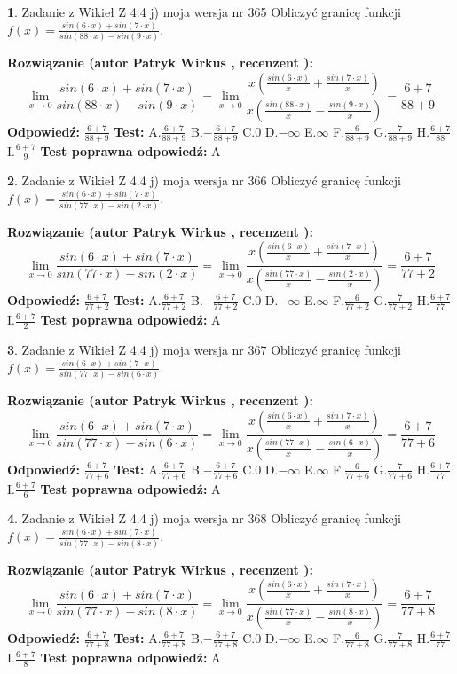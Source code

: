 \documentclass[12pt, a4paper]{article}
\theoremstyle{definition} %
\newtheorem{zad}{}
\newcommand{\zadStart}[1]{\begin{zad}#1\newline}
\newcommand{\zadStop}{\end{zad}}
\newcommand{\rozwStart}[2]{\noindent \textbf{Rozwiązanie (autor #1 , recenzent #2): }\newline}
\newcommand{\rozwStop}{\newline}
\newcommand{\odpStart}{\noindent \textbf{Odpowiedź:}\newline}
\newcommand{\odpStop}{\newline}
\newcommand{\testStart}{\noindent \textbf{Test:}\newline}
\newcommand{\testStop}{\newline}
\newcommand{\kluczStart}{\noindent \textbf{Test poprawna odpowiedź:}\newline}
\newcommand{\kluczStop}{\newline}
\begin{document}
\zadStart{Zadanie z Wikieł Z 4.4 j) moja wersja nr 365}
Obliczyć granicę funkcji $f(x)=\frac{sin(6\cdot x) +sin(7\cdot x)}{sin(88\cdot x) -sin(9\cdot x)}$.
\zadStop
\rozwStart{Patryk Wirkus}{}
$$\lim\limits_{x\to 0}\frac{sin(6\cdot x) +sin(7\cdot x)}{sin(88\cdot x) -sin(9\cdot x)}=\lim\limits_{x\to 0}\frac{x(\frac{sin(6\cdot x)}{x}+\frac{sin(7\cdot x)}{x})}{x(\frac{sin(88\cdot x)}{x}-\frac{sin(9\cdot x)}{x})}=\frac{6+7}{88+9}$$
\rozwStop
\odpStart
$\frac{6+7}{88+9}$
\odpStop
\testStart
A.$\frac{6+7}{88+9}$
B.$-\frac{6+7}{88+9}$
C.$0$
D.$-\infty$
E.$\infty$
F.$\frac{6}{88+9}$
G.$\frac{7}{88+9}$
H.$\frac{6+7}{88}$
I.$\frac{6+7}{9}$
\testStop
\kluczStart
A
\kluczStop



\zadStart{Zadanie z Wikieł Z 4.4 j) moja wersja nr 366}
Obliczyć granicę funkcji $f(x)=\frac{sin(6\cdot x) +sin(7\cdot x)}{sin(77\cdot x) -sin(2\cdot x)}$.
\zadStop
\rozwStart{Patryk Wirkus}{}
$$\lim\limits_{x\to 0}\frac{sin(6\cdot x) +sin(7\cdot x)}{sin(77\cdot x) -sin(2\cdot x)}=\lim\limits_{x\to 0}\frac{x(\frac{sin(6\cdot x)}{x}+\frac{sin(7\cdot x)}{x})}{x(\frac{sin(77\cdot x)}{x}-\frac{sin(2\cdot x)}{x})}=\frac{6+7}{77+2}$$
\rozwStop
\odpStart
$\frac{6+7}{77+2}$
\odpStop
\testStart
A.$\frac{6+7}{77+2}$
B.$-\frac{6+7}{77+2}$
C.$0$
D.$-\infty$
E.$\infty$
F.$\frac{6}{77+2}$
G.$\frac{7}{77+2}$
H.$\frac{6+7}{77}$
I.$\frac{6+7}{2}$
\testStop
\kluczStart
A
\kluczStop



\zadStart{Zadanie z Wikieł Z 4.4 j) moja wersja nr 367}
Obliczyć granicę funkcji $f(x)=\frac{sin(6\cdot x) +sin(7\cdot x)}{sin(77\cdot x) -sin(6\cdot x)}$.
\zadStop
\rozwStart{Patryk Wirkus}{}
$$\lim\limits_{x\to 0}\frac{sin(6\cdot x) +sin(7\cdot x)}{sin(77\cdot x) -sin(6\cdot x)}=\lim\limits_{x\to 0}\frac{x(\frac{sin(6\cdot x)}{x}+\frac{sin(7\cdot x)}{x})}{x(\frac{sin(77\cdot x)}{x}-\frac{sin(6\cdot x)}{x})}=\frac{6+7}{77+6}$$
\rozwStop
\odpStart
$\frac{6+7}{77+6}$
\odpStop
\testStart
A.$\frac{6+7}{77+6}$
B.$-\frac{6+7}{77+6}$
C.$0$
D.$-\infty$
E.$\infty$
F.$\frac{6}{77+6}$
G.$\frac{7}{77+6}$
H.$\frac{6+7}{77}$
I.$\frac{6+7}{6}$
\testStop
\kluczStart
A
\kluczStop



\zadStart{Zadanie z Wikieł Z 4.4 j) moja wersja nr 368}
Obliczyć granicę funkcji $f(x)=\frac{sin(6\cdot x) +sin(7\cdot x)}{sin(77\cdot x) -sin(8\cdot x)}$.
\zadStop
\rozwStart{Patryk Wirkus}{}
$$\lim\limits_{x\to 0}\frac{sin(6\cdot x) +sin(7\cdot x)}{sin(77\cdot x) -sin(8\cdot x)}=\lim\limits_{x\to 0}\frac{x(\frac{sin(6\cdot x)}{x}+\frac{sin(7\cdot x)}{x})}{x(\frac{sin(77\cdot x)}{x}-\frac{sin(8\cdot x)}{x})}=\frac{6+7}{77+8}$$
\rozwStop
\odpStart
$\frac{6+7}{77+8}$
\odpStop
\testStart
A.$\frac{6+7}{77+8}$
B.$-\frac{6+7}{77+8}$
C.$0$
D.$-\infty$
E.$\infty$
F.$\frac{6}{77+8}$
G.$\frac{7}{77+8}$
H.$\frac{6+7}{77}$
I.$\frac{6+7}{8}$
\testStop
\kluczStart
A
\kluczStop
\end{document}
